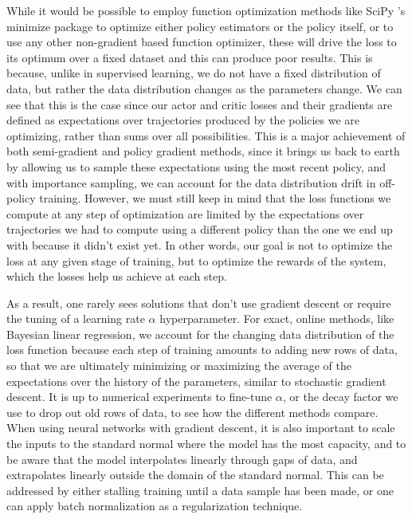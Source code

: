 \documentclass{article}
\begin{document}
While it would be possible to employ function optimization methods like SciPy 's minimize package to optimize either policy estimators or the policy itself, or to use any other non-gradient based function optimizer, these will drive the loss to its optimum over a fixed dataset and this can produce poor results. This is because, unlike in supervised learning, we do not have a fixed distribution of data, but rather the data distribution changes as the parameters change. We can see that this is the case since our actor and critic losses and their gradients are defined as expectations over trajectories produced by the policies we are optimizing, rather than sums over all possibilities. This is a major achievement of both semi-gradient and policy gradient methods, since it brings us back to earth by allowing us to sample these expectations using the most recent policy, and with importance sampling, we can account for the data distribution drift in off-policy training. However, we must still keep in mind that the loss functions we compute at any step of optimization are limited by the expectations over trajectories we had to compute using a different policy than the one we end up with because it didn't exist yet. In other words, our goal is not to optimize the loss at any given stage of training, but to optimize the rewards of the system, which the losses help us achieve at each step.

As a result, one rarely sees solutions that don't use gradient descent or require the tuning of a learning rate $\alpha$ hyperparameter. For exact, online methods, like Bayesian linear regression, we account for the changing data distribution of the loss function because each step of training amounts to adding new rows of data, so that we are ultimately minimizing or maximizing the average of the expectations over the history of the parameters, similar to stochastic gradient descent. It is up to numerical experiments to fine-tune $\alpha$, or the decay factor we use to drop out old rows of data, to see how the different methods compare. When using neural networks with gradient descent, it is also important to scale the inputs to the standard normal where the model has the most capacity, and to be aware that the model interpolates linearly through gaps of data, and extrapolates linearly outside the domain of the standard normal. This can be addressed by either stalling training until a data sample has been made, or one can apply batch normalization\cite{batch_normalization} as a regularization technique.
\end{document}
